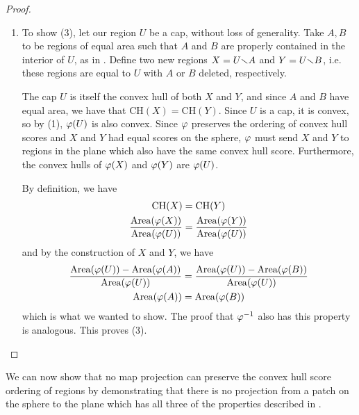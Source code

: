 \begin{proof}
\begin{enumerate}
		That $\vphi^{-1}$ sends line segments in the plane to great circle segments on the sphere is shown analogously.  
		
		This completes the proof of (2).
		
		
		
\item[] To show (3), let our region $U$ be a cap, without loss of generality.  Take $A,B$ to be regions of equal area such that $A$ and $B$ are properly contained in the interior of $U$, as in .  Define two new regions $X=U{\smallsetminus} A$ and $Y=U{\smallsetminus} B$, i.e. these regions are equal to $U$ with $A$ or $B$ deleted, respectively.  

The cap $U$ is itself the convex hull of both $X$ and $Y$, and since $A$ and $B$ have equal area, we have that $\mathrm{CH}(X) = \mathrm{CH}(Y)$.  Since $U$ is a cap, it is convex, so by (1), $\varphi(U)$ is also convex.  Since $\varphi$ preserves the ordering of convex hull scores and $X$ and $Y$ had equal scores on the sphere, $\varphi$ must send $X$ and $Y$ to regions in the plane which also have the same convex hull score.  Furthermore, the convex hulls of $\varphi(X)$ and $\varphi(Y)$ are $\varphi(U)$.

By definition, we have
\begin{align*}
\mathrm{CH}(X) &= \mathrm{CH}(Y)\\
\frac{\mathrm{Area}(\varphi(X))}{\mathrm{Area}(\varphi(U))} &= \frac{\mathrm{Area}(\varphi(Y))}{\mathrm{Area}(\varphi(U))}
\end{align*}
and by the construction of $X$ and $Y$, we have 
\begin{align*}
\frac{\mathrm{Area}(\varphi(U)) - \mathrm{Area}(\varphi(A))}{\mathrm{Area}(\varphi(U))} &= \frac{\mathrm{Area}(\varphi(U)) - \mathrm{Area}(\varphi(B))}{\mathrm{Area}(\varphi(U))}\\
\mathrm{Area}(\varphi(A)) &= \mathrm{Area}(\varphi(B))
\end{align*}
 which is what we wanted to show.  The proof that $\vphi^{-1}$ also has this property is analogous.  This proves (3).
\end{enumerate}
\end{proof}

We can now show that no map projection can preserve the convex hull score ordering of regions by demonstrating that there is no projection from a patch on the sphere to the plane which has all three of the properties described  in . 


